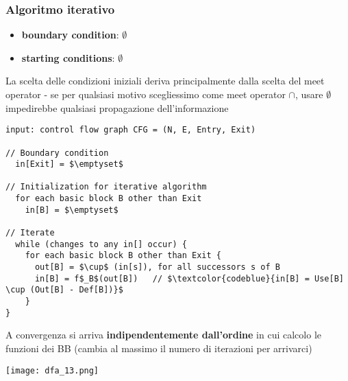 \subsubsection{Algoritmo iterativo}

\noindent\begin{minipage}[c]{.3\textwidth}
  \begin{itemize}
    \item \textbf{boundary condition}: $\emptyset$
    \item \textbf{starting conditions}: $\emptyset$
  \end{itemize}
\end{minipage}\hfill
\begin{minipage}[c]{.67\textwidth}
  \begin{emphasize}
    La scelta delle condizioni iniziali deriva principalmente dalla scelta del meet operator - se per qualsiasi motivo scegliessimo come meet operator $\cap$, usare $\emptyset$ impedirebbe qualsiasi propagazione dell'informazione
  \end{emphasize}
\end{minipage}

\vspace{1em}
\begin{lstlisting}
input: control flow graph CFG = (N, E, Entry, Exit)

// Boundary condition
  in[Exit] = $\emptyset$

// Initialization for iterative algorithm
  for each basic block B other than Exit
    in[B] = $\emptyset$

// Iterate
  while (changes to any in[] occur) {
    for each basic block B other than Exit {
      out[B] = $\cup$ (in[s]), for all successors s of B
      in[B] = f$_B$(out[B])   // $\textcolor{codeblue}{in[B] = Use[B] \cup (Out[B] - Def[B])}$
    }
}\end{lstlisting}

\begin{emphasize}
  A convergenza si arriva \textbf{indipendentemente dall'ordine} in cui calcolo le funzioni dei BB (cambia al massimo il numero di iterazioni per arrivarci)
\end{emphasize}

\begin{example}
  \begin{center}
    \texttt{[image: dfa\_13.png]}
  \end{center}
\end{example}

